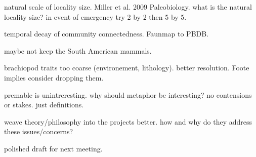 \documentclass[12pt,letterpaper]{article}
\begin{document}
natural scale of locality size. Miller et al. 2009 Paleobiology. what is the natural locality size? in event of emergency try 2 by 2 then 5 by 5.

temporal decay of community connectedness. Faunmap to PBDB.

maybe not keep the South American mammals.

brachiopod traits too coarse (environement, lithology). better resolution. Foote implies consider dropping them.

premable is unintreresting. why should metaphor be interesting? no contensions or stakes. just definitions.

weave theory/philosophy into the projects better. how and why do they address these issues/concerns?

polished draft for next meeting.
\end{document}
